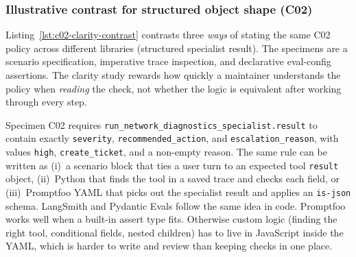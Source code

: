 \subsubsection{Illustrative contrast for structured object shape (C02)}

Listing~\ref{lst:c02-clarity-contrast} contrasts three \emph{ways} of stating the same C02 policy across different libraries (structured specialist result). The specimens are a scenario specification, imperative trace inspection, and declarative eval-config assertions. The clarity study rewards how quickly a maintainer understands the policy when \emph{reading} the check, not whether the logic is equivalent after working through every step.

Specimen C02 requires \texttt{run\_network\_diagnostics\_specialist.result} to contain exactly \texttt{severity}, \texttt{recommended\_action}, and \texttt{escalation\_reason}, with values \texttt{high}, \texttt{create\_ticket}, and a non-empty reason. The same rule can be written as (i)~a scenario block that ties a user turn to an expected tool \texttt{result} object, (ii)~Python that finds the tool in a saved trace and checks each field, or (iii)~Promptfoo YAML that picks out the specialist result and applies an \texttt{is-json} schema. LangSmith and Pydantic Evals follow the same idea in code. Promptfoo works well when a built-in assert type fits. Otherwise custom logic (finding the right tool, conditional fields, nested children) has to live in JavaScript inside the YAML, which is harder to write and review than keeping checks in one place.

